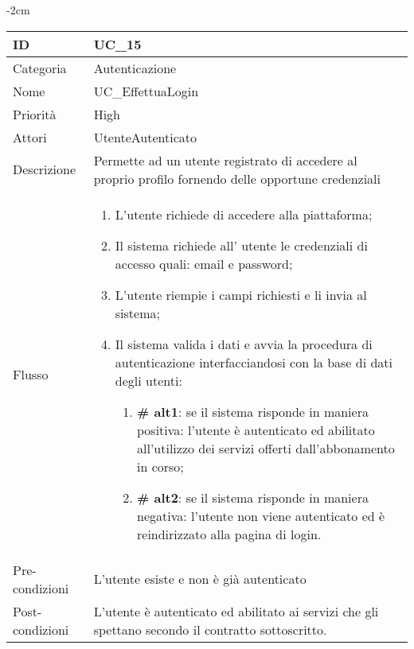 \begin{center}
\begin{table}[bp]
    \centering
    \addtolength{\leftskip} {-2cm}
\begin{tabular}{ |p{2.6cm}|p{13cm}|  }
\hline
ID & UC\_15 \\\hline
Categoria & Autenticazione \\\hline
Nome & UC\_EffettuaLogin \\\hline
Priorità & High \\\hline
Attori &  UtenteAutenticato \\\hline
Descrizione & Permette ad un utente registrato di accedere al proprio profilo fornendo delle opportune credenziali \\\hline
Flusso &  	\begin{enumerate}
			\item L'utente richiede di accedere alla piattaforma;
			\item Il sistema richiede all' utente le credenziali di accesso quali: email e password;
			\item L'utente riempie i campi richiesti e li invia al sistema;
			\item Il sistema valida i dati e avvia la procedura di autenticazione interfacciandosi con la base di dati degli utenti:
			\begin{enumerate}[  ]
				\item \textbf{\# alt1}: se il sistema risponde in maniera positiva: l'utente è autenticato ed abilitato all'utilizzo dei servizi offerti dall'abbonamento in corso; 
				\item \textbf{\# alt2}: se il sistema risponde in maniera negativa: l'utente non viene autenticato ed è reindirizzato alla pagina di login.
			\end{enumerate}
		\end{enumerate}\\\hline
Pre-condizioni &  L'utente esiste e non è già autenticato\\\hline
Post-condizioni &  L'utente è autenticato ed abilitato ai servizi che gli spettano secondo il contratto sottoscritto.\\\hline
\end{tabular}
\label{table_use_case:15}\newline
\end{table}


\end{center}
